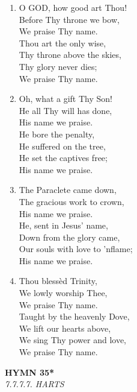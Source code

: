 \begin{enumerate}
    \item O GOD, how good art Thou! \\
        Before Thy throne we bow, \\
        We praise Thy name. \\
        Thou art the only wise, \\
        Thy throne above the skies, \\
        Thy glory never dies; \\
        We praise Thy name.

    \item Oh, what a gift Thy Son! \\
        He all Thy will has done, \\
        His name we praise. \\
        He bore the penalty, \\
        He suffered on the tree, \\
        He set the captives free; \\
        His name we praise.

    \item The Paraclete came down, \\
        The gracious work to crown, \\
        His name we praise. \\
        He, sent in Jesus' name, \\
        Down from the glory came, \\
        Our souls with love to 'nflame; \\
        His name we praise.

    \item Thou bless\`ed Trinity, \\
        We lowly worship Thee, \\
        We praise Thy name. \\
        Taught by the heavenly Dove, \\
        We lift our hearts above, \\
        We sing Thy power and love, \\
        We praise Thy name.

\end{enumerate}

\newpage
\begin{center}
    {\Large \textbf{HYMN 35*}}
    \\
    \textit{7.7.7.7. HARTS}
\end{center}
\vspace{1em}

